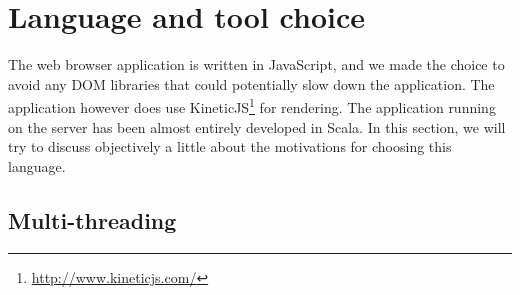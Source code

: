 \section{Language and tool choice}
%
The web browser application is written in JavaScript, and we made the 
choice to avoid any DOM libraries that could potentially slow down the application.
The application however does use KineticJS\footnote{\url{http://www.kineticjs.com/}}
for rendering.
%
The application running on the server has been almost entirely developed in Scala. 
In this section, we will try to discuss objectively a little about 
the motivations for choosing this language.
%
\subsection{Multi-threading}


